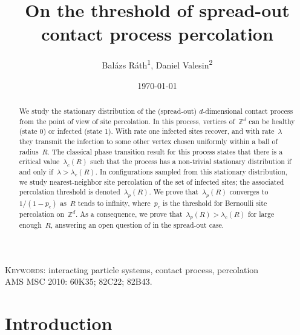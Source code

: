 \documentclass[a4paper,12pt]{article}
\begin{document}
\title{On the  threshold of spread-out \\ contact process percolation}

\author{Bal\'azs R\'ath\textsuperscript{1}, Daniel Valesin\textsuperscript{2}}
\date{\today}
\maketitle



\begin{abstract}
\noindent We study the stationary distribution of the (spread-out) $d$-dimensional contact process from the point of view of site percolation. In this process, vertices of~$\mathbb{Z}^d$ can be healthy (state 0) or infected (state 1). With rate one infected sites recover, and with rate~$\lambda$ they transmit the infection to some other vertex chosen uniformly within a ball of radius~$R$. The classical phase transition result for this process states that there is a critical value~$\lambda_c(R)$ such that the process has a non-trivial stationary distribution if and only if~$\lambda > \lambda_c(R)$. In configurations sampled from this stationary distribution, we study nearest-neighbor site percolation of the set of infected sites; the associated percolation threshold is denoted~$\lambda_p(R)$. We prove that~$\lambda_p(R)$ converges to~$1/(1-p_c)$ as~$R$ tends to infinity, where~$p_c$ is the threshold for Bernoulli site percolation on~$\mathbb{Z}^d$. As a consequence, we prove that~$\lambda_p(R) > \lambda_c(R)$ for large enough~$R$, answering an open question of \cite{LS06} in the spread-out case.
\end{abstract}

\noindent \textsc{Keywords:} interacting particle systems, contact process, percolation\\
\textsc{AMS MSC 2010:} 60K35; 82C22; 82B43.

\newpage

\tableofcontents

\newpage

\section{Introduction}
\end{document}
